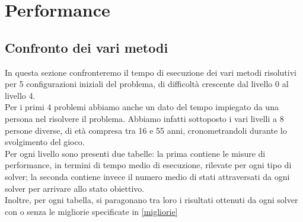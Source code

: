 
\chapter{Performance}
\label{cap:performance}
\section{Confronto dei vari metodi}
In questa sezione confronteremo il tempo di esecuzione dei vari metodi risolutivi per 5 configurazioni iniziali del problema, di difficoltà crescente dal livello 0 al livello 4.\\
Per i primi 4 problemi abbiamo anche un dato del tempo impiegato da una persona nel risolvere il problema. Abbiamo infatti sottoposto i vari livelli a 8 persone diverse, di età compresa tra 16 e 55 anni, cronometrandoli durante lo svolgimento del gioco.\\
Per ogni livello sono presenti due tabelle: la prima contiene le misure di performance, in termini di tempo medio di esecuzione, rilevate per ogni tipo di solver; la seconda contiene invece il numero medio di stati attraversati da ogni solver per arrivare allo stato obiettivo. \\
Inoltre, per ogni tabella, si paragonano tra loro i risultati ottenuti da ogni solver con o senza le migliorie specificate in \ref{migliorie}
